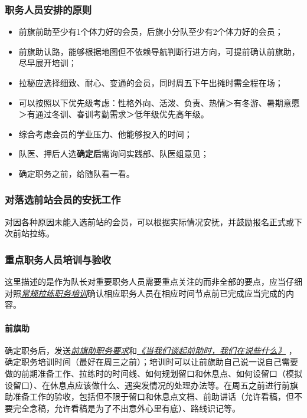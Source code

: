 \documentclass[UTF8]{ctexart}
\begin{document}
\subsubsection{职务人员安排的原则}

\begin{itemize}[nosep,left=2em]
    \item 前旗前助至少有1个体力好的会员，后旗小分队至少有2个体力好的会员；
    \item 前旗助认路，能够根据地图但不依赖导航判断行进方向，可提前确认前旗助，尽早展开培训；
    \item 拉秘应选择细致、耐心、变通的会员，同时周五下午出摊时需全程在场；
    \item 可以按照以下优先级考虑：性格外向、活泼、负责、热情＞有冬游、暑期意愿＞有通过冬训、春训考勤需求＞低年级优先高年级。
    \item 综合考虑会员的学业压力、他能够投入的时间；
    \item 队医、押后人选\textbf{确定后}需询问实践部、队医组意见；
    \item 确定职务之前，给随队看一看。    
\end{itemize}

\subsubsection{对落选前站会员的安抚工作}

对因各种原因未能入选前站的会员，可以根据实际情况安抚，并鼓励报名正式或下次前站拉练。

\subsubsection{重点职务人员培训与验收}

这里描述的是作为队长对重要职务人员需要重点关注的而非全部的要点，应当仔细对照\href{https://chexie.net/bbs/content/?bid=7&tid=1062&p=1}{\textit{常规拉练职务培训}}确认相应职务人员在相应时间节点前已完成应当完成的内容。

\paragraph{前旗助}

确定职务后，发送\href{https://chexie.net/bbs/content/?bid=7&tid=1062&p=1#2}{\textit{前旗助职务要求}}和\href{https://www.chexie.net/bbs/content/?bid=7&tid=879&p=1}{\textit{《当我们谈起前助时，我们在说些什么》}}
，确定职务培训时间（最好在周三之前）；培训时可以让前旗助自己说一说自己需要做的前期准备工作、拉练时的时间线、如何规划留口和休息点、如何设留口（模拟设留口）、在休息点应该做什么、遇突发情况的处理办法等。在周五之前进行前旗助准备工作的验收，包括但不限于留口和休息点文档、前助讲话（允许看稿，但不要完全念稿，允许看稿是为了不出意外心里有底）、路线识记等。
\end{document}

